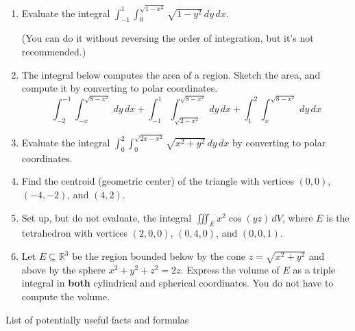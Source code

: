 \documentclass[12pt]{article}
\newcommand{\points}[1]{\marginpar{\hspace{24pt}[#1]}}
\newcommand{\di}{\displaystyle}
\newcommand{\R}{\mathbb{R}}
\begin{document}
\begin{enumerate}
\item Evaluate the integral $\di \int_{-1}^1\int_0^{\sqrt{1-x^2}}\sqrt{1-y^2}\,dy\,dx$. \points{6}

(You can do it without reversing the order of integration, but it's not recommended.)


\vspace{3.5in}

\item The integral below computes the area of a region. Sketch the area, and compute it by converting to polar coordinates. \points{6}
\[
\int_{-2}^{-1}\int_{-x}^{\sqrt{8-x^2}}\,dy\,dx+\int_{-1}^1\int_{\sqrt{2-x^2}}^{\sqrt{8-x^2}}\,dy\,dx + \int_1^2\int_x^{\sqrt{8-x^2}}\,dy\,dx
\]
\newpage
\item Evaluate the integral $\di \int_0^2\int_0^{\sqrt{2x-x^2}}\sqrt{x^2+y^2}\,dy\,dx$ by converting to polar coordinates. \points{6}

\vspace{3in}

\item Find the centroid (geometric center) of the triangle with vertices $(0,0)$, $(-4,-2)$, and $(4,2)$. \points{8}

\newpage

\item Set up, but do not evaluate, the integral $\di \iiint_E x^2\cos(yz)\,dV$, where $E$ is the tetrahedron with vertices $(2,0,0)$, $(0,4,0)$, and $(0,0,1)$. \points{6}

\vspace{3.5in}

\item Let $E\subseteq \R^3$ be the region bounded below by the cone $z=\sqrt{x^2+y^2}$ and above by the sphere $x^2+y^2+z^2=2z$. Express the volume of $E$ as a triple integral in {\bf both} cylindrical and spherical coordinates. You do not have to compute the volume. \points{6}
\end{enumerate}
\newpage
\begin{center}
List of potentially useful facts and formulas
\end{center}
\end{document}
